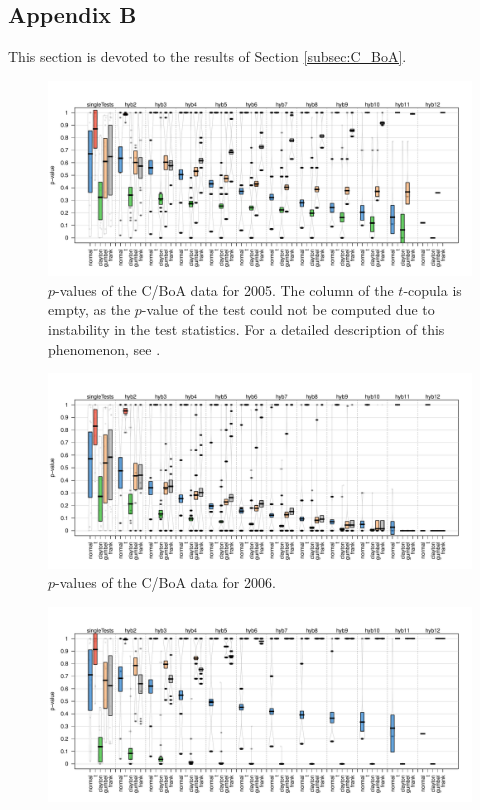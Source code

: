 \begin{appendices}
\renewcommand\thefigure{B.\arabic{figure}}
\setcounter{figure}{0}
\section{Appendix B}
\label{sec:AppendixStock}
This section is devoted to the results of Section \ref{subsec:C_BoA}.
\vspace{-0.5cm}
\begin{figure}[H]
	\centering
 \includegraphics[width=\textwidth]{img/C_BoA_05.pdf}
	\caption{$p$-values of the C/BoA data for 2005. The column \mycolor \protect{} \bk of the $t$-copula is empty, as the $p$-value of the test \protect{} could not be computed due to instability in the test statistics. For a detailed description of this phenomenon, see \citet{schepsmeier2018package}.}
	\label{Pirateplot_C_BoA_05}
\end{figure}
\vspace{-0.5cm}
\begin{figure}[H]
	\centering
 \includegraphics[width=\textwidth]{img/C_BoA_06.pdf}
	\caption{$p$-values of the C/BoA data for 2006.}
	\label{Pirateplot_C_BoA_06}
\end{figure}
\vspace{-0.5cm}
\begin{figure}[H]
	\centering
 \includegraphics[width=\textwidth]{img/C_BoA_08.pdf}

\end{figure}
\end{appendices}
